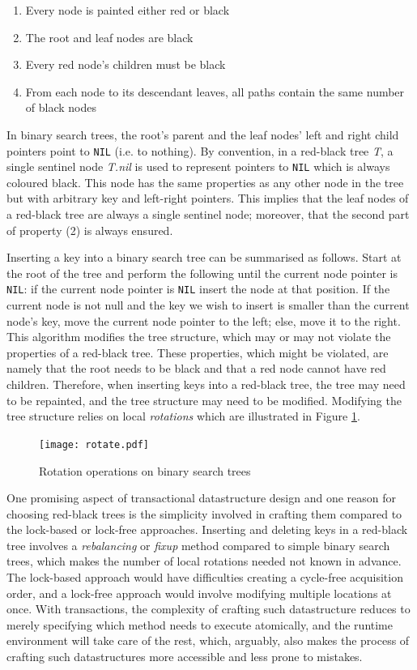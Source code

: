 \begin{enumerate}
    \item Every node is painted either red or black
    \item The root and leaf nodes are black
    \item Every red node's children must be black
    \item From each node to its descendant leaves, all paths contain the same number of black nodes
\end{enumerate}

In binary search trees, the root's parent and the leaf nodes' left and right child pointers point to \texttt{NIL} (i.e. to nothing). By convention, in a red-black tree \textit{T}, a single sentinel node \textit{T.nil} is used to represent pointers to \texttt{NIL} which is always coloured black. This node has the same properties as any other node in the tree but with arbitrary key and left-right pointers. This implies that the leaf nodes of a red-black tree are always a single sentinel node; moreover, that the second part of property (2) is always ensured.

Inserting a key into a binary search tree can be summarised as follows. Start at the root of the tree and perform the following until the current node pointer is \texttt{NIL}: if the current node pointer is \texttt{NIL} insert the node at that position. If the current node is not null and the key we wish to insert is smaller than the current node's key, move the current node pointer to the left; else, move it to the right. This algorithm modifies the tree structure, which may or may not violate the properties of a red-black tree. These properties, which might be violated, are namely that the root needs to be black and that a red node cannot have red children. Therefore, when inserting keys into a red-black tree, the tree may need to be repainted, and the tree structure may need to be modified. Modifying the tree structure relies on local \textit{rotations} which are illustrated in Figure \ref{fig:rotate}.

\begin{figure}[!htb]
    \centering
    \texttt{[image: rotate.pdf]}
    \caption{Rotation operations on binary search trees}
    \label{fig:rotate}
\end{figure}

One promising aspect of transactional datastructure design and one reason for choosing red-black trees is the simplicity involved in crafting them compared to the lock-based or lock-free approaches. Inserting and deleting keys in a red-black tree involves a \textit{rebalancing} or \textit{fixup} method compared to simple binary search trees, which makes the number of local rotations needed not known in advance. The lock-based approach would have difficulties creating a cycle-free acquisition order\cite{book}, and a lock-free approach\cite{ma, lock-free-rb, wait-free-rb} would involve modifying multiple locations at once. With transactions, the complexity of crafting such datastructure reduces to merely specifying which method needs to execute atomically, and the runtime environment will take care of the rest, which, arguably, also makes the process of crafting such datastructures more accessible and less prone to mistakes. 

